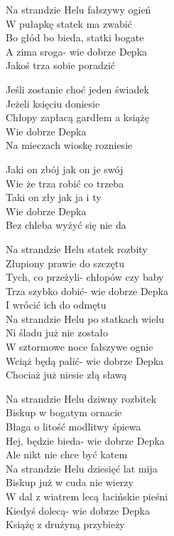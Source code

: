 \begin{text}
    Na strandzie Helu fałszywy ogień\\
    W pułapkę statek ma zwabić\\
    Bo głód bo bieda, statki bogate\\
    A zima sroga- wie dobrze Depka\\
    Jakoś trza sobie poradzić

    \vin Jeśli zostanie choć jeden świadek\\
    \vin Jeżeli księciu doniesie\\
    \vin Chłopy zapłacą gardłem a książę\\
    \vin Wie dobrze Depka\\
    \vin Na mieczach wioskę rozniesie

    \vin Jaki on zbój jak on je swój\\
    \vin Wie że trza robić co trzeba\\
    \vin Taki on zły jak ja i ty\\
    \vin Wie dobrze Depka\\
    \vin Bez chleba wyżyć się nie da

    Na strandzie Helu statek rozbity\\
    Złupiony prawie do szczętu\\
    Tych, co przeżyli- chłopów czy baby\\
    Trza szybko dobić- wie dobrze Depka\\
    I wrócić ich do odmętu\\
    \vin Na strandzie Helu po statkach wielu\\
    \vin Ni śladu już nie zostało\\
    \vin W sztormowe noce fałszywe ognie\\
    \vin Wciąż będą palić- wie dobrze Depka\\
    \vin Chociaż już niesie złą sławą

    Na strandzie Helu dziwny rozbitek\\
    Biskup w bogatym ornacie\\
    Błaga o litość modlitwy śpiewa\\
    Hej, będzie bieda- wie dobrze Depka\\
    Ale nikt nie chce być katem\\
    \vin Na strandzie Helu dziesięć lat mija\\
    \vin Biskup już w cuda nie wierzy\\
    \vin W dal z wiatrem lecą łacińskie pieśni\\
    \vin Kiedyś dolecą- wie dobrze Depka\\
    \vin Książę z drużyną przybieży


\end{text}

